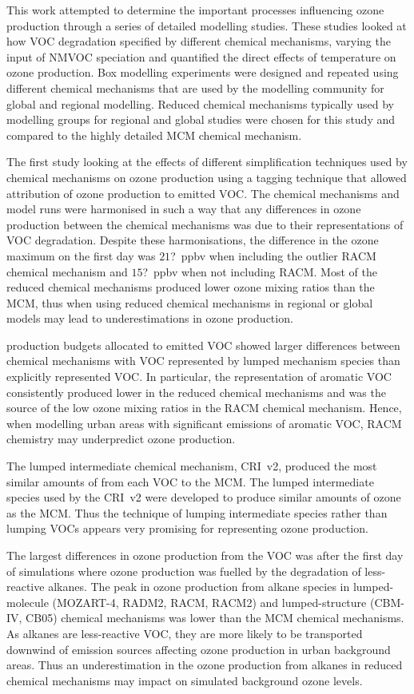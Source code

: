 This work attempted to determine the important processes influencing ozone production through a series of detailed modelling studies.
These studies looked at how VOC degradation specified by different chemical mechanisms, varying the input of NMVOC speciation and quantified the direct effects of temperature on ozone production.
Box modelling experiments were designed and repeated using different chemical mechanisms that are used by the modelling community for global and regional modelling.
Reduced chemical mechanisms typically used by modelling groups for regional and global studies were chosen for this study and compared to the highly detailed MCM chemical mechanism.

The first study looking at the effects of different simplification techniques used by chemical mechanisms on ozone production using a tagging technique that allowed attribution of ozone production to emitted VOC.
The chemical mechanisms and model runs were harmonised in such a way that any differences in ozone production between the chemical mechanisms was due to their representations of VOC degradation.
Despite these harmonisations, the difference in the ozone maximum on the first day was $21$?~ppbv when including the outlier RACM chemical mechanism and $15$?~ppbv when not including RACM.
Most of the reduced chemical mechanisms produced lower ozone mixing ratios than the MCM, thus when using reduced chemical mechanisms in regional or global models may lead to underestimations in ozone production.

 production budgets allocated to emitted VOC showed larger differences between chemical mechanisms with VOC represented by lumped mechanism species than explicitly represented VOC.
In particular, the representation of aromatic VOC consistently produced lower  in the reduced chemical mechanisms and was the source of the low ozone mixing ratios in the RACM chemical mechanism.
Hence, when modelling urban areas with significant emissions of aromatic VOC, RACM chemistry may underpredict ozone production.

The lumped intermediate chemical mechanism, CRI~v2, produced the most similar amounts of  from each VOC to the MCM.
The lumped intermediate species used by the CRI~v2 were developed to produce similar amounts of ozone as the MCM.
Thus the technique of lumping intermediate species rather than lumping VOCs appears very promising for representing ozone production.

The largest differences in ozone production from the VOC was after the first day of simulations where ozone production was fuelled by the degradation of less-reactive alkanes.
The peak in ozone production from alkane species in lumped-molecule (MOZART-4, RADM2, RACM, RACM2) and lumped-structure (CBM-IV, CB05) chemical mechanisms was lower than the MCM chemical mechanisms.
As alkanes are less-reactive VOC, they are more likely to be transported downwind of emission sources affecting ozone production in urban background areas.
Thus an underestimation in the ozone production from alkanes in reduced chemical mechanisms may impact on simulated background ozone levels.

